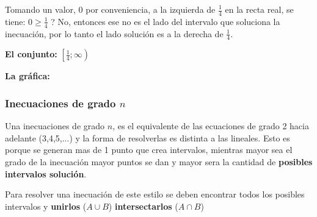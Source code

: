 \documentclass[12pt]{article}
\begin{document}
    Tomando un valor, 0 por conveniencia, a la izquierda de $\displaystyle\frac{1}{4}$
    en la recta real,
    se tiene: $\displaystyle0 \geq \frac{1}{4} $ ? No, entonces ese no es el lado del intervalo que
    soluciona la inecuación, por lo tanto el lado solución es a la derecha de
    $\displaystyle\frac{1}{4}$.


    \textbf{El conjunto:} $\displaystyle\left[\frac{1}{4}; \infty\right)$

    \textbf{La gráfica:}

    \vspace*{1cm}


\subsubsection*{Inecuaciones de grado $n$}
    Una inecuaciones de grado $n$, es el equivalente de las ecuaciones de grado
    2 hacia adelante (3,4,5,...) y la forma de resolverlas es distinta a las
    lineales. Esto es porque se generan mas de 1 punto que crea intervalos, mientras
    mayor sea el grado de la inecuación mayor puntos se dan y mayor sera la
    cantidad de \textbf{posibles intervalos solución}.

    Para resolver una inecuación de este estilo se deben encontrar todos los
    posibles intervalos y \textbf{unirlos} ($ A\cup B $)
    \textbf{intersectarlos} ($ A\cap B$)
\end{document}
